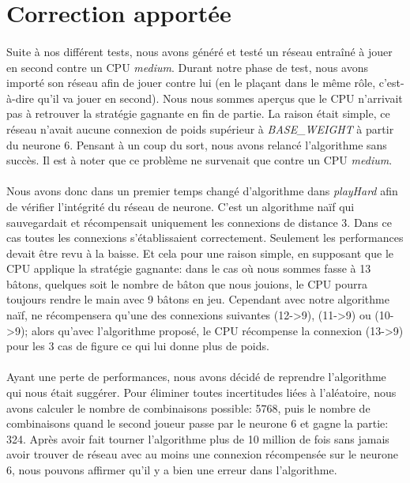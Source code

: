\documentclass{article}
\begin{document}
\newpage

\section{Correction apportée}
  \paragraph{}
    Suite à nos différent tests, nous avons généré et testé un réseau entraîné à jouer en second contre un CPU \emph{medium}.
    Durant notre phase de test, nous avons importé son réseau afin de jouer contre lui (en le plaçant dans le même rôle, c'est-à-dire qu'il va jouer en second).
    Nous nous sommes aperçus que le CPU n'arrivait pas à retrouver la stratégie gagnante en fin de partie. La raison était simple, ce réseau n'avait aucune 
    connexion de poids supérieur à \emph{BASE\_WEIGHT} à partir du neurone 6. Pensant à un coup du sort, nous avons relancé l'algorithme sans succès. Il est à noter
    que ce problème ne survenait que contre un CPU \emph{medium}.
  \paragraph{}
    Nous avons donc dans un premier temps changé d'algorithme dans \emph{playHard} afin de vérifier l'intégrité du réseau de neurone. C'est un algorithme naïf
    qui sauvegardait et récompensait uniquement les connexions de distance 3. Dans ce cas toutes les connexions s'établissaient correctement. Seulement 
    les performances devait être revu à la baisse. Et cela pour une raison simple, en supposant que le CPU applique la stratégie gagnante: dans le cas où nous sommes 
    fasse à 13 bâtons, quelques soit le nombre de bâton que nous jouions, le CPU pourra toujours rendre le main avec 9 bâtons en jeu. Cependant avec notre algorithme naïf, 
    ne récompensera qu'une des connexions suivantes (12->9), (11->9) ou (10->9);
    alors qu'avec l'algorithme proposé, le CPU récompense la connexion (13->9) pour les 3 cas de figure ce qui lui donne plus de poids.
  \paragraph{}
    Ayant une perte de performances, nous avons décidé de reprendre l'algorithme qui nous était suggérer. Pour éliminer toutes incertitudes liées à l'aléatoire,
    nous avons calculer le nombre de combinaisons possible: 5768, puis le nombre de combinaisons quand le second joueur passe par le neurone 6 et gagne la partie: 324.
    Après avoir fait tourner l'algorithme plus de 10 million de fois sans jamais avoir trouver de réseau avec au moins une connexion récompensée sur le neurone 6, 
    nous pouvons affirmer qu'il y a bien une erreur dans l'algorithme.
\end{document}

